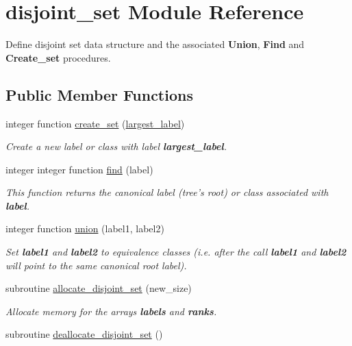 \hypertarget{classdisjoint__set}{
\section{disjoint\-\_\-set \-Module \-Reference}
\label{classdisjoint__set}
}


\-Define disjoint set data structure and the associated {\bfseries \-Union}, {\bfseries \-Find} and {\bfseries \-Create\-\_\-set} procedures.  


\subsection*{\-Public \-Member \-Functions}
\begin{DoxyCompactItemize}
\item 
integer function \hyperlink{classdisjoint__set_a8c1daa7a7d930e585da226e2c9fefade}{create\-\_\-set} (\hyperlink{classdisjoint__set_a2a38373e2aad581740cb09ecf192d3b1}{largest\-\_\-label})
\begin{DoxyCompactList}\small\item\em \-Create a new label or class with label {\bfseries largest\-\_\-label}. \end{DoxyCompactList}\item 
integer integer function \hyperlink{classdisjoint__set_ab6b25124690d8aa322228fa7f5f5b6a9}{find} (label)
\begin{DoxyCompactList}\small\item\em \-This function returns the canonical label (tree's root) or class associated with {\bfseries label}. \end{DoxyCompactList}\item 
integer function \hyperlink{classdisjoint__set_a8720fef5da5ac5aeb67204627a97609e}{union} (label1, label2)
\begin{DoxyCompactList}\small\item\em \-Set {\bfseries label1} and {\bfseries label2} to equivalence classes (i.\-e. after the call {\bfseries label1} and {\bfseries label2} will point to the same canonical root label). \end{DoxyCompactList}\item 
subroutine \hyperlink{classdisjoint__set_a8b0154868bb171e8ac0f42c496b8df03}{allocate\-\_\-disjoint\-\_\-set} (new\-\_\-size)
\begin{DoxyCompactList}\small\item\em \-Allocate memory for the arrays {\bfseries labels} and {\bfseries ranks}. \end{DoxyCompactList}\item 
subroutine \hyperlink{classdisjoint__set_ab857fcb49e8b9ab86627d3863b20e67e}{deallocate\-\_\-disjoint\-\_\-set} ()
\end{DoxyCompactItemize}
